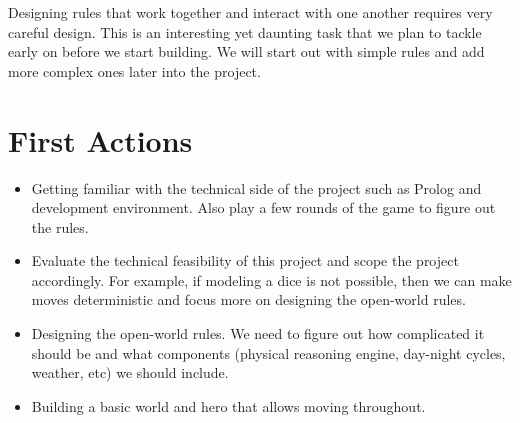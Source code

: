 \documentclass[10pt]{article}
\begin{document}
Designing rules that work together and interact with one another requires very careful design. This is an interesting yet daunting task that we plan to tackle early on before we start building. We will start out with simple rules and add more complex ones later into the project.


\section{First Actions}

\begin{itemize}
\item Getting familiar with the technical side of the project such as Prolog and development environment. Also play a few rounds of the game to figure out the rules.
\item Evaluate the technical feasibility of this project and scope the project accordingly. For example, if modeling a dice is not possible, then we can make moves deterministic and focus more on designing the open-world rules.
\item Designing the open-world rules. We need to figure out how complicated it should be and what components (physical reasoning engine, day-night cycles, weather, etc) we should include.
\item Building a basic world and hero that allows moving throughout.
\end{itemize}




\end{document}
